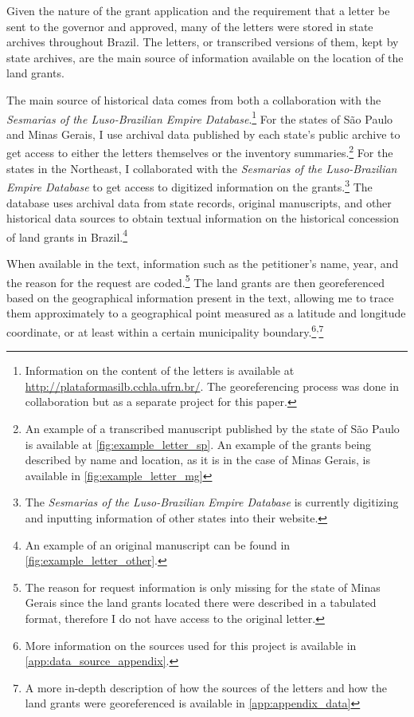 \documentclass[11pt]{article}
\begin{document}
Given the nature of the grant application and the requirement that a letter be sent to the governor and approved, many of the letters were stored in state archives throughout Brazil. 
The letters, or transcribed versions of them, kept by state archives, are the main source of information available on the location of the land grants.


The main source of historical data comes from both a collaboration with the \textit{Sesmarias of the Luso-Brazilian Empire Database}.\footnote{
  Information on the content of the letters is available at \url{http://plataformasilb.cchla.ufrn.br/}. The georeferencing process was done in collaboration but as a separate project for this paper.}
For the states of São Paulo and Minas Gerais, I use archival data published by each state's public archive to get access to either the letters themselves or the inventory summaries.\footnote{An example of a transcribed manuscript published by the state of São Paulo is available at \autoref{fig:example_letter_sp}. An example of the grants being described by name and location, as it is in the case of Minas Gerais, is available in \autoref{fig:example_letter_mg}}
For the states in the Northeast, I collaborated with the \textit{Sesmarias of the Luso-Brazilian Empire Database} to get access to digitized information on the grants.\footnote{The \textit{Sesmarias of the Luso-Brazilian Empire Database} is currently digitizing and inputting information of other states into their website.}
The database uses archival data from state records, original manuscripts, and other historical data sources to obtain textual information on the historical concession of land grants in Brazil.\footnote{An example of an original manuscript can be found in \autoref{fig:example_letter_other}.} 

When available in the text, information such as the petitioner's name, year, and the reason for the request are coded.\footnote{The reason for request information is only missing for the state of Minas Gerais since the land grants located there were described in a tabulated format, therefore I do not have access to the original letter.}
The land grants are then georeferenced based on the geographical information present in the text, allowing me to trace them approximately to a geographical point measured as a latitude and longitude coordinate, or at least within a certain municipality boundary.\footnote{More information on the sources used for this project is available in \autoref{app:data_source_appendix}.}\textsuperscript{,}\footnote{A more in-depth description of how the sources of the letters and how the land grants were georeferenced is available in \autoref{app:appendix_data}}
\end{document}
